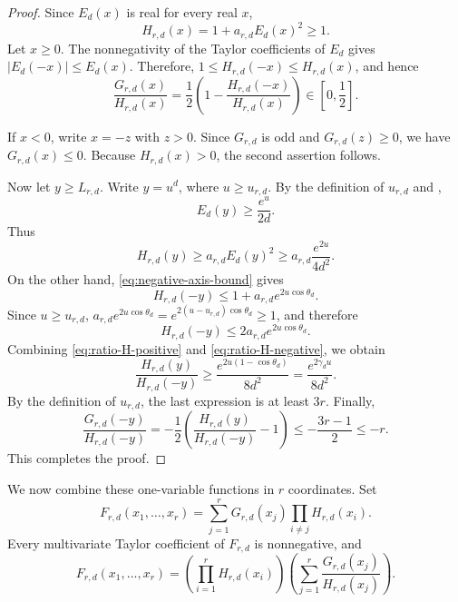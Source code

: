 \documentclass[twoside,12pt]{article}
\theoremstyle{definition}
\theoremstyle{remark}
\newcommand{\1}{\mathbf 1}
\begin{document}
\begin{proof}
Since $E_d(x)$ is real for every real $x$,
\[
 H_{r,d}(x)=1+a_{r,d}E_d(x)^2\ge1.
\]
Let $x\ge0$. The nonnegativity of the Taylor coefficients of $E_d$ gives
$|E_d(-x)|\le E_d(x)$.
Therefore, $1\le H_{r,d}(-x)\le H_{r,d}(x)$,
and hence
\[
 \frac{G_{r,d}(x)}{H_{r,d}(x)}
 =\frac12\left(1-\frac{H_{r,d}(-x)}{H_{r,d}(x)}\right)
 \in\left[0,\frac12\right].
\]

If $x<0$, write $x=-z$ with $z>0$. Since $G_{r,d}$ is odd and
$G_{r,d}(z)\ge0$, we have $G_{r,d}(x)\le0$. Because $H_{r,d}(x)>0$, the
second assertion follows.

Now let $y\ge L_{r,d}$. Write $y=u^d$, where $u\ge u_{r,d}$. By the
definition of $u_{r,d}$ and ,
\[
 E_d(y)\ge\frac{e^u}{2d}.
\]
Thus
\begin{equation}\label{eq:ratio-H-positive}
 H_{r,d}(y)
 \ge a_{r,d}E_d(y)^2
 \ge a_{r,d}\frac{e^{2u}}{4d^2}.
\end{equation}
On the other hand, \eqref{eq:negative-axis-bound} gives
\[
 H_{r,d}(-y)
 \le1+a_{r,d}e^{2u\cos\theta_d}.
\]
Since $u\ge u_{r,d}$,
$a_{r,d}e^{2u\cos\theta_d}
 =e^{2(u-u_{r,d})\cos\theta_d}\ge1$,
and therefore
\begin{equation}\label{eq:ratio-H-negative}
 H_{r,d}(-y)\le2a_{r,d}e^{2u\cos\theta_d}.
\end{equation}
Combining \eqref{eq:ratio-H-positive} and
\eqref{eq:ratio-H-negative}, we obtain
\[
 \frac{H_{r,d}(y)}{H_{r,d}(-y)}
 \ge\frac{e^{2u(1-\cos\theta_d)}}{8d^2}
 =\frac{e^{2\gamma_du}}{8d^2}.
\]
By the definition of $u_{r,d}$, the last expression is at least $3r$.
Finally,
\[
 \frac{G_{r,d}(-y)}{H_{r,d}(-y)}
 =-\frac12\left(\frac{H_{r,d}(y)}{H_{r,d}(-y)}-1\right)
 \le-\frac{3r-1}{2}\le-r.
\]
This completes the proof.
\end{proof}

We now combine these one-variable functions in $r$ coordinates. Set
\[
 F_{r,d}(x_1,\ldots,x_r)
 =\sum_{j=1}^rG_{r,d}(x_j)\prod_{i\ne j}H_{r,d}(x_i).
\]
Every multivariate Taylor coefficient of $F_{r,d}$ is nonnegative, and
\begin{equation}\label{eq:separator-factorisation}
 F_{r,d}(x_1,\ldots,x_r)
 =\left(\prod_{i=1}^rH_{r,d}(x_i)\right)
 \left(\sum_{j=1}^r\frac{G_{r,d}(x_j)}{H_{r,d}(x_j)}\right).
\end{equation}
\end{document}
